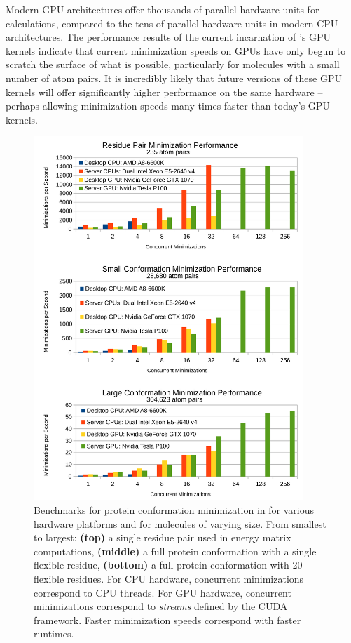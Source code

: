 Modern GPU architectures offer thousands of parallel hardware units for calculations, compared to the tens of parallel hardware units in modern CPU architectures. The performance results of the current incarnation of \osprey's GPU kernels indicate that current minimization speeds on GPUs have only begun to scratch the surface of what is possible, particularly for molecules with a small number of atom pairs. It is incredibly likely that future versions of these GPU kernels will offer significantly higher performance on the same hardware -- perhaps allowing minimization speeds many times faster than today's GPU kernels.

\begin{figure}\label{fig:gpu}
\center
\includegraphics[width=4in]{figures/gpu.pdf}

\caption{Benchmarks for protein conformation minimization in  for various hardware platforms and for molecules of varying size. From smallest to largest: {\bf (top)} a single residue pair used in energy matrix computations, {\bf (middle)} a full protein conformation with a single flexible residue, {\bf (bottom)} a full protein conformation with 20 flexible residues. For CPU hardware, concurrent minimizations correspond to CPU threads. For GPU hardware, concurrent minimizations correspond to {\it streams} defined by the CUDA framework. Faster minimization speeds correspond with faster \osprey runtimes.}
\end{figure}
